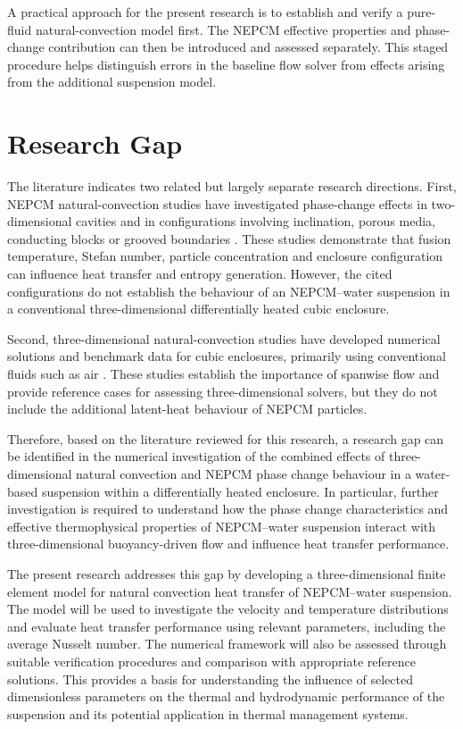 A practical approach for the present research is to establish and verify a pure-fluid natural-convection model first. The NEPCM effective properties and phase-change contribution can then be introduced and assessed separately. This staged procedure helps distinguish errors in the baseline flow solver from effects arising from the additional suspension model.

\section{Research Gap}

The literature indicates two related but largely separate research directions. First, NEPCM natural-convection studies have investigated phase-change effects in two-dimensional cavities and in configurations involving inclination, porous media, conducting blocks or grooved boundaries \citep{ghalambaz2019,ghalambaz2020,ghalambaz2023,golab2021,hussain2022}. These studies demonstrate that fusion temperature, Stefan number, particle concentration and enclosure configuration can influence heat transfer and entropy generation. However, the cited configurations do not establish the behaviour of an NEPCM--water suspension in a conventional three-dimensional differentially heated cubic enclosure.

Second, three-dimensional natural-convection studies have developed numerical solutions and benchmark data for cubic enclosures, primarily using conventional fluids such as air \citep{fusegi1991,tric2000,wakashima2004,bennett2006}. These studies establish the importance of spanwise flow and provide reference cases for assessing three-dimensional solvers, but they do not include the additional latent-heat behaviour of NEPCM particles.

Therefore, based on the literature reviewed for this research, a research gap can be identified in the numerical investigation of the combined effects of three-dimensional natural convection and NEPCM phase change behaviour in a water-based suspension within a differentially heated enclosure. In particular, further investigation is required to understand how the phase change characteristics and effective thermophysical properties of NEPCM--water suspension interact with three-dimensional buoyancy-driven flow and influence heat transfer performance.

The present research addresses this gap by developing a three-dimensional finite element model for natural convection heat transfer of NEPCM--water suspension. The model will be used to investigate the velocity and temperature distributions and evaluate heat transfer performance using relevant parameters, including the average Nusselt number. The numerical framework will also be assessed through suitable verification procedures and comparison with appropriate reference solutions. This provides a basis for understanding the influence of selected dimensionless parameters on the thermal and hydrodynamic performance of the suspension and its potential application in thermal management systems.
